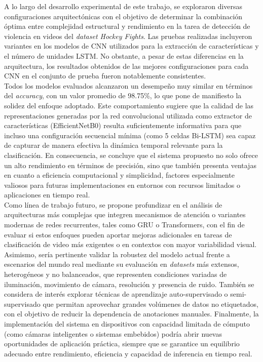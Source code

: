 A lo largo del desarrollo experimental de este trabajo, se 
exploraron diversas configuraciones arquitectónicas con el 
objetivo de determinar la combinación óptima entre complejidad 
estructural y rendimiento en la tarea de detección de violencia 
en videos del \textit{dataset Hockey Fights}. Las pruebas 
realizadas incluyeron variantes en los modelos de CNN utilizados 
para la extracción de características y el número de unidades LSTM. 
No obstante, a pesar de estas diferencias en la arquitectura, 
los resultados obtenidos de las mejores configuraciones para cada 
CNN en el conjunto de prueba fueron notablemente consistentes.\\

Todos los modelos evaluados alcanzaron un desempeño muy similar en 
términos del \textit{accuracy}, con un valor promedio de 98.75\%, lo que 
pone de manifiesto la solidez del enfoque adoptado. Este 
comportamiento sugiere que la calidad de las representaciones 
generadas por la red convolucional utilizada como extractor de 
características (EfficientNetB0) resulta suficientemente 
informativa para que incluso una configuración secuencial mínima 
(como 5 celdas Bi-LSTM) sea capaz de capturar de manera 
efectiva la dinámica temporal relevante para la clasificación. 
En consecuencia, se concluye que el sistema propuesto no solo 
ofrece un alto rendimiento en términos de precisión, sino que 
también presenta ventajas en cuanto a eficiencia computacional y 
simplicidad, factores especialmente valiosos para futuras 
implementaciones en entornos con recursos limitados o 
aplicaciones en tiempo real.\\

Como línea de trabajo futuro, se propone profundizar en el 
análisis de arquitecturas más complejas que integren mecanismos 
de atención o variantes modernas de redes recurrentes, tales 
como GRU o Transformers, con el fin de evaluar si estos enfoques 
pueden aportar mejoras adicionales en tareas de clasificación 
de video más exigentes o en contextos con mayor variabilidad 
visual. Asimismo, sería pertinente validar la robustez del 
modelo actual frente a escenarios del mundo real mediante su 
evaluación en \textit{datasets} más extensos, heterogéneos y no balanceados, 
que representen condiciones variadas de iluminación, movimiento 
de cámara, resolución y presencia de ruido. También se considera 
de interés explorar técnicas de aprendizaje auto-supervisado 
o semi-supervisado que permitan aprovechar grandes volúmenes de 
datos no etiquetados, con el objetivo de reducir la dependencia 
de anotaciones manuales. Finalmente, la implementación del 
sistema en dispositivos con capacidad limitada de cómputo (como 
cámaras inteligentes o sistemas embebidos) podría abrir nuevas 
oportunidades de aplicación práctica, siempre que se garantice 
un equilibrio adecuado entre rendimiento, eficiencia y capacidad 
de inferencia en tiempo real.
